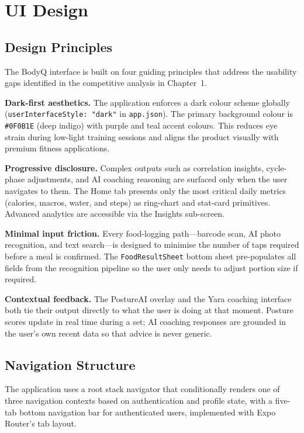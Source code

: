 \section{UI Design}

\subsection{Design Principles}

The BodyQ interface is built on four guiding principles that address
the usability gaps identified in the competitive analysis in
Chapter~1.

\textbf{Dark-first aesthetics.} The application enforces a dark colour
scheme globally (\texttt{userInterfaceStyle: "dark"} in
\texttt{app.json}). The primary background colour is
\texttt{\#0F0B1E} (deep indigo) with purple and teal accent colours.
This reduces eye strain during low-light training sessions and aligns
the product visually with premium fitness applications.

\textbf{Progressive disclosure.} Complex outputs such as correlation
insights, cycle-phase adjustments, and AI coaching reasoning are
surfaced only when the user navigates to them. The Home tab presents
only the most critical daily metrics (calories, macros, water, and
steps) as ring-chart and stat-card primitives. Advanced analytics
are accessible via the Insights sub-screen.

\textbf{Minimal input friction.} Every food-logging path---barcode
scan, AI photo recognition, and text search---is designed to minimise
the number of taps required before a meal is confirmed. The
\texttt{FoodResultSheet} bottom sheet pre-populates all fields from
the recognition pipeline so the user only needs to adjust portion
size if required.

\textbf{Contextual feedback.} The PostureAI overlay and the Yara
coaching interface both tie their output directly to what the user is
doing at that moment. Posture scores update in real time during a
set; AI coaching responses are grounded in the user's own recent data
so that advice is never generic.

\subsection{Navigation Structure}

The application uses a root stack navigator that conditionally renders
one of three navigation contexts based on authentication and profile
state, with a five-tab bottom navigation bar for authenticated users,
implemented with Expo Router's tab layout.

